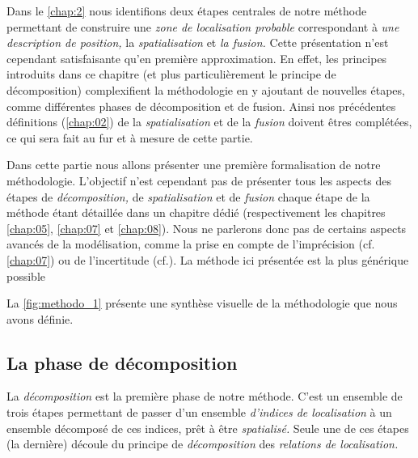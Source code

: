 Dans le \autoref{chap:2} nous identifions deux étapes centrales de
notre méthode permettant de construire une \emph{zone de localisation
  probable} correspondant à \emph{une description de position,} la
\emph{spatialisation} et \emph{la fusion.} Cette présentation n'est
cependant satisfaisante qu'en première approximation. En effet, les
principes introduits dans ce chapitre (et plus particulièrement le
principe de décomposition) complexifient la méthodologie en y ajoutant
de nouvelles étapes, comme différentes phases de décomposition et de
fusion. Ainsi nos précédentes définitions (\autoref{chap:02}) de la
\emph{spatialisation} et de la \emph{fusion} doivent êtres complétées,
ce qui sera fait au fur et à mesure de cette partie.

Dans cette partie nous allons présenter une première formalisation de
notre méthodologie. L'objectif n'est cependant pas de présenter tous
les aspects des étapes de \emph{décomposition,} de
\emph{spatialisation} et de \emph{fusion} chaque étape de la méthode
étant détaillée dans un chapitre dédié (respectivement les chapitres
\ref{chap:05}, \ref{chap:07} et \ref{chap:08}). Nous ne parlerons donc
pas de certains aspects avancés de la modélisation, comme la prise en
compte de l'imprécision (cf. \autoref{chap:07}) ou de l'incertitude
(cf.). La méthode ici présentée est la plus générique possible  

La \autoref{fig:methodo_1} présente une synthèse visuelle de la
méthodologie que nous avons définie.

\subsection{La phase de décomposition}

La \emph{décomposition} est la première phase de notre méthode. C'est
un ensemble de trois étapes permettant de passer d'un ensemble
\emph{d'indices de localisation} à un ensemble décomposé de ces
indices, prêt à être \emph{spatialisé.} Seule une de ces étapes (la
dernière) découle du principe de \emph{décomposition} des \emph{relations de localisation.}


